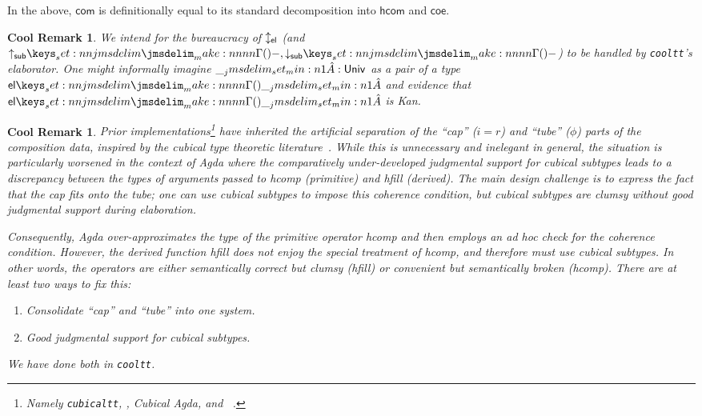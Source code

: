 \documentclass[final]{amsart}
\newtheorem{cool}[theorem]{Cool Remark}
\begin{document}
In the above, $\mathsf{com}$ is definitionally equal to its standard
decomposition into $\mathsf{hcom}$ and $\mathsf{coe}$.

\begin{cool}
We intend for the bureaucracy of ${\updownarrow_{\mathsf{el}}}$ (and $\SubIn{-},\SubOut{-}$) to be
handled by \texttt{cooltt}'s elaborator. One might informally imagine $\__jmsdelim_set_min:n {1}\hat{A}:\mathsf{Univ}$ as a pair of a type
$\TpEl{\Code{A}}$ and evidence that $\TpEl{\Code{A}}$ is Kan.
\end{cool}

\begin{cool}
  Prior implementations\footnote{Namely \texttt{cubicaltt}, \RedPRL{}, Cubical Agda, and \redtt{}~\citep{cchm:cubicaltt,
  vezzosi-mortberg-abel:2019,redtt:2018,redprl:2018}.} have
  inherited the artificial separation of the ``cap'' ($i=r$) and ``tube'' ($\phi$)
  parts of the composition data, inspired by the cubical type theoretic
  literature~\citep{cchm:2017,angiuli-favonia-harper:2017,orton-pitts:2016,abcfhl:2019}.
  While this is unnecessary and inelegant in general, the situation is
  particularly worsened in the context of Agda where the comparatively
  under-developed judgmental support for cubical subtypes leads to a
  discrepancy between the types of arguments passed to \textsf{hcomp}
  (primitive) and \textsf{hfill} (derived).
%
  The main design challenge is to express the fact that the cap \emph{fits}
  onto the tube; one can use cubical subtypes to impose this coherence
  condition, but cubical subtypes are clumsy without good judgmental support
  during elaboration.

  Consequently, Agda over-approximates the type of the primitive operator
  \textsf{hcomp} and then employs an ad hoc check for the coherence condition.
  However, the \emph{derived} function \textsf{hfill} does not enjoy the
  special treatment of \textsf{hcomp}, and therefore must use cubical subtypes. In other
  words, the operators are either semantically correct but clumsy
  (\textsf{hfill}) or convenient but semantically broken (\textsf{hcomp}).
  There are at least two ways to fix this:
  \begin{enumerate}
    \item Consolidate ``cap'' and ``tube'' into one system.
    \item Good judgmental support for cubical subtypes.
  \end{enumerate}

  We have done both in \texttt{cooltt}.
\end{cool}
\end{document}
